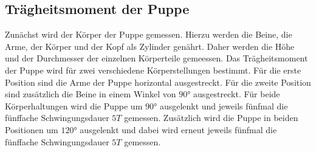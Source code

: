 \subsection{Trägheitsmoment der Puppe}
\label{sec:TragheitPuppe}
%
Zunächst wird der Körper der Puppe gemessen. Hierzu werden die Beine, die Arme, der Körper und der Kopf als Zylinder
genährt. Daher werden die Höhe und der Durchmesser der einzelnen Körperteile gemeessen. Das Trägheitsmoment der Puppe wird 
für zwei verschiedene Körperstellungen bestimmt. Für die erste Position sind die Arme der Puppe horizontal ausgestreckt. 
Für die zweite Position sind zusätzlich die Beine in einem Winkel von $90°$ ausgestreckt. Für beide Körperhaltungen wird 
die Puppe um $90°$ ausgelenkt und jeweils fünfmal die fünffache Schwingungsdauer $5T$ gemessen. Zusätzlich wird die Puppe 
in beiden Positionen um $120°$ ausgelenkt und dabei wird erneut jeweils fünfmal die fünffache Schwingungsdauer $5T$ gemessen. 